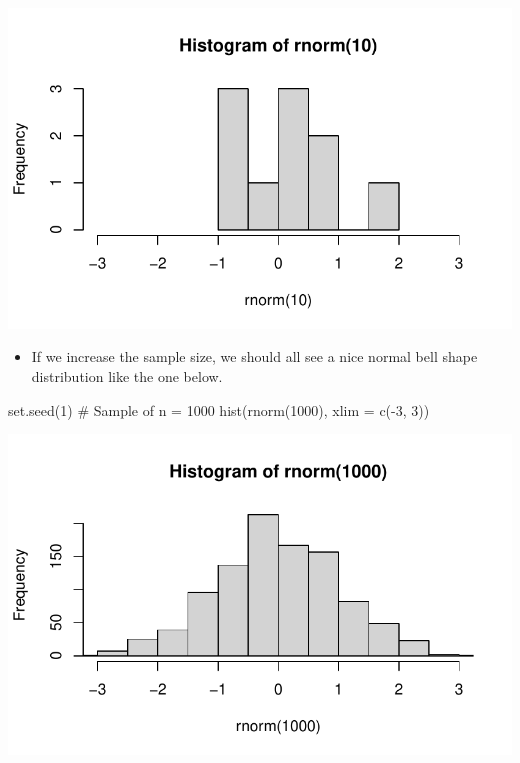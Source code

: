 \documentclass[
  letterpaper,
  DIV=11,
  numbers=noendperiod]{scrreprt}
\newenvironment{Shaded}{\begin{snugshade}}{\end{snugshade}}
\newcommand{\AttributeTok}[1]{\textcolor[rgb]{0.40,0.45,0.13}{#1}}
\newcommand{\CommentTok}[1]{\textcolor[rgb]{0.37,0.37,0.37}{#1}}
\newcommand{\DecValTok}[1]{\textcolor[rgb]{0.68,0.00,0.00}{#1}}
\newcommand{\FunctionTok}[1]{\textcolor[rgb]{0.28,0.35,0.67}{#1}}
\newcommand{\NormalTok}[1]{\textcolor[rgb]{0.00,0.23,0.31}{#1}}
\newcommand{\SpecialCharTok}[1]{\textcolor[rgb]{0.37,0.37,0.37}{#1}}
\providecommand{\tightlist}{%
  \setlength{\itemsep}{0pt}\setlength{\parskip}{0pt}}\usepackage{longtable,booktabs,array}
\begin{document}
\includegraphics{probability_files/figure-pdf/unnamed-chunk-42-1.pdf}

\begin{itemize}
\tightlist
\item
  If we increase the sample size, we should all see a nice normal bell
  shape distribution like the one below.
\end{itemize}

\begin{Shaded}
\begin{Highlighting}[]
\FunctionTok{set.seed}\NormalTok{(}\DecValTok{1}\NormalTok{)}
\CommentTok{\# Sample of n = 1000}
\FunctionTok{hist}\NormalTok{(}\FunctionTok{rnorm}\NormalTok{(}\DecValTok{1000}\NormalTok{), }\AttributeTok{xlim =} \FunctionTok{c}\NormalTok{(}\SpecialCharTok{{-}}\DecValTok{3}\NormalTok{, }\DecValTok{3}\NormalTok{))}
\end{Highlighting}
\end{Shaded}

\includegraphics{probability_files/figure-pdf/unnamed-chunk-43-1.pdf}
\end{document}
